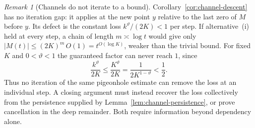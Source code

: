\documentclass[11pt,reqno]{amsart}
\numberwithin{equation}{section}
\theoremstyle{plain}
\theoremstyle{definition}
\theoremstyle{remark}
\newtheorem{remark}[theorem]{Remark}
\begin{document}
\begin{remark}[Channels do not iterate to a bound]
\label{rem:channel-loss}
Corollary~\ref{cor:channel-descent} has no iteration gap: it applies at
the new point $y$ relative to the last zero of $M$ before $y$. Its defect
is the constant loss $k^\vartheta/(2K)<1$ per step. If alternative~(i) held at
every step, a chain of length $m\asymp\log t$ would give only
$|M(t)|\le(2K)^m\,O(1)=t^{O(\log K)}$, weaker than the trivial bound.
For fixed $K$ and $0<\vartheta<1$ the guaranteed factor can never reach
$1$, since
\begin{equation}
 \frac{k^\vartheta}{2K}\le\frac{K^\vartheta}{2K}
 =\frac1{2K^{1-\vartheta}}<\frac12.
\end{equation}
Thus no iteration of the same pigeonhole estimate can remove the loss at an
individual step.  A closing argument must instead recover the loss
collectively from the persistence supplied by
Lemma~\ref{lem:channel-persistence}, or prove cancellation in the deep
remainder.  Both require information beyond dependency alone.
\end{remark}
\end{document}
